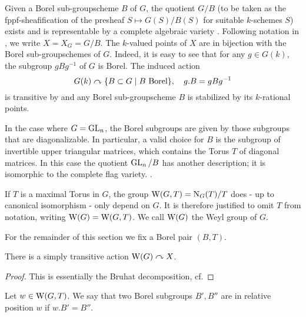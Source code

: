 \documentclass[../main.tex]{subfiles}
\begin{document}
Given a Borel sub-groupscheme $B$ of $G$, the quotient $G/B$ (to be taken as 
the fppf-sheafification  of the presheaf $S \mapsto G(S)/B(S)$ for 
suitable $k$-schemes $S$) exists and is representable by a complete algebraic
variety . Following notation in \cite{delignelusztig1976}, we write 
$X = X_G = G/B$. The $k$-valued points of $X$ are in bijection with the 
Borel sub-groupschemes of $G$. Indeed, it is easy to see that for any $g \in G(k)$,
the subgroup $g B g^{-1}$ of $G$ is Borel. The induced action
\begin{equation*}
  G(k) \curvearrowright \{B \subset G \mid B \text{ Borel}\}, \quad g.B = gBg^{-1}
\end{equation*}
is transitive by  and any Borel sub-groupscheme $B$ is
stabilized by its $k$-rational points. 

\begin{rmk} 
  In the case where $G = \operatorname{GL}_n$, the Borel subgroups are given by those subgroups
  that are diagonalizable. In particular, a valid choice for $B$
  is the subgroup of invertible upper triangular matrices, which contains the 
  Torus $T$ of diagonal matrices. In this case the quotient $\operatorname{GL}_n/B$ has
  another description; it is isomorphic to the complete flag variety. 
  .
\end{rmk}

\begin{defi}\label{def:WeylGrp}
  If $T$ is a maximal Torus in $G$, the group $\mathrm W(G,T) = \mathrm{N}_G(T)/T$ does - up to
  canonical isomorphism - only depend on $G$. It is therefore justified to omit
  $T$ from notation, writing $\mathrm W(G) = \mathrm W(G,T)$. We call $\mathrm W(G)$ the
  Weyl group of $G$.
\end{defi}

For the remainder of this section we fix a Borel pair $(B,T)$. 

\begin{prop}\label{prop:WeylGroupActsOnBorel}
  There is a simply transitive action $\mathrm W(G) \curvearrowright X$. 
\begin{proof}
  This is essentially the Bruhat decomposition, cf. 
\end{proof}
\end{prop}

\begin{defi}\label{def:BorelsInRelPos}
  Let $w \in \mathrm W(G, T)$. 
  We say that two Borel subgroups $B', B''$ are in relative position $w$ if 
  $w.B' = B''$. 
\end{defi}
\end{document}
